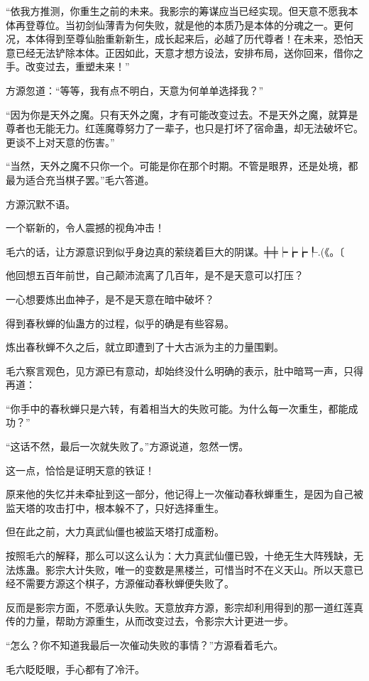 \begin{this_body}
“依我方推测，你重生之前的未来。我影宗的筹谋应当已经实现。但天意不愿我本体再登尊位。当初剑仙薄青为何失败，就是他的本质乃是本体的分魂之一。更何况，本体得到至尊仙胎重新新生，成长起来后，必越了历代尊者！在未来，恐怕天意已经无法铲除本体。正因如此，天意才想方设法，安排布局，送你回来，借你之手。改变过去，重塑未来！”

方源忽道：“等等，我有点不明白，天意为何单单选择我？”

“因为你是天外之魔。只有天外之魔，才有可能改变过去。不是天外之魔，就算是尊者也无能无力。红莲魔尊努力了一辈子，也只是打坏了宿命蛊，却无法破坏它。更谈不上对天意的伤害。”

“当然，天外之魔不只你一个。可能是你在那个时期。不管是眼界，还是处境，都最为适合充当棋子罢。”毛六答道。

方源沉默不语。

一个崭新的，令人震撼的视角冲击！

毛六的话，让方源意识到似乎身边真的萦绕着巨大的阴谋。╪╪┝┢┢┞.(《。〔

他回想五百年前世，自己颠沛流离了几百年，是不是天意可以打压？

一心想要炼出血神子，是不是天意在暗中破坏？

得到春秋蝉的仙蛊方的过程，似乎的确是有些容易。

炼出春秋蝉不久之后，就立即遭到了十大古派为主的力量围剿。

毛六察言观色，见方源已有意动，却始终没什么明确的表示，肚中暗骂一声，只得再道：

“你手中的春秋蝉只是六转，有着相当大的失败可能。为什么每一次重生，都能成功？”

“这话不然，最后一次就失败了。”方源说道，忽然一愣。

这一点，恰恰是证明天意的铁证！

原来他的失忆并未牵扯到这一部分，他记得上一次催动春秋蝉重生，是因为自己被监天塔的攻击打中，根本躲不了，只好选择重生。

但在此之前，大力真武仙僵也被监天塔打成齑粉。

按照毛六的解释，那么可以这么认为：大力真武仙僵已毁，十绝无生大阵残缺，无法炼蛊。影宗大计失败，唯一的变数是黑楼兰，可惜当时不在义天山。所以天意已经不需要方源这个棋子，方源催动春秋蝉便失败了。

反而是影宗方面，不愿承认失败。天意放弃方源，影宗却利用得到的那一道红莲真传的力量，帮助方源重生，从而改变过去，令影宗大计更进一步。

“怎么？你不知道我最后一次催动失败的事情？”方源看着毛六。

毛六眨眨眼，手心都有了冷汗。


\end{this_body}
